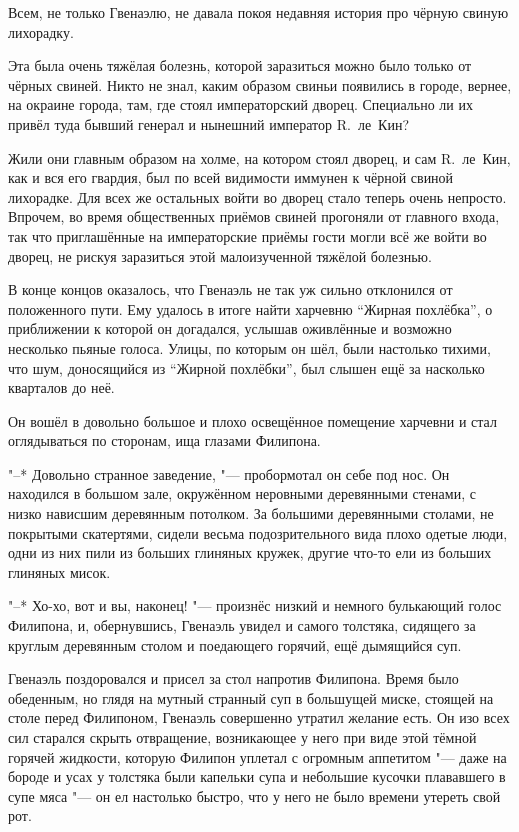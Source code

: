 Всем, не только Гвенаэлю, не давала покоя недавняя история про чёрную свиную
лихорадку.

Эта была очень тяжёлая болезнь, которой заразиться можно было только от чёрных
свиней.
Никто не знал, каким образом свиньи появились в городе, вернее, на окраине
города, там, где стоял императорский дворец.
Специально ли их привёл туда бывший генерал и нынешний император R.~ле~Кин?

Жили они главным образом на холме, на котором стоял дворец, и сам R.~ле~Кин, как
и вся его гвардия, был по всей видимости иммунен к чёрной свиной лихорадке.
Для всех же остальных войти во дворец стало теперь очень непросто.
Впрочем, во время общественных приёмов свиней прогоняли от главного входа, так
что приглашённые на императорские приёмы гости могли всё же войти во дворец, не
рискуя заразиться этой малоизученной тяжёлой болезнью.

В конце концов оказалось, что Гвенаэль не так уж сильно отклонился от
положенного пути.
Ему удалось в итоге найти харчевню \enquote{Жирная похлёбка}, о приближении к
которой он догадался, услышав оживлённые и возможно несколько пьяные голоса.
Улицы, по которым он шёл, были настолько тихими, что шум, доносящийся из
\enquote{Жирной похлёбки}, был слышен ещё за насколько кварталов до неё.

Он вошёл в довольно большое и плохо освещённое помещение харчевни и стал
оглядываться по сторонам, ища глазами Филипона.

"--* Довольно странное заведение, "--- пробормотал он себе под нос.
Он находился в большом зале, окружённом неровными деревянными стенами, с низко
нависшим деревянным потолком.
За большими деревянными столами, не покрытыми скатертями, сидели весьма
подозрительного вида плохо одетые люди, одни из них пили из больших глиняных
кружек, другие что-то ели из больших глиняных мисок.

"--* Хо-хо, вот и вы, наконец! "--- произнёс низкий и немного булькающий голос
Филипона, и, обернувшись, Гвенаэль увидел и самого толстяка, сидящего за круглым
деревянным столом и поедающего горячий, ещё дымящийся суп.

Гвенаэль поздоровался и присел за стол напротив Филипона.
Время было обеденным, но глядя на мутный странный суп в большущей миске, стоящей
на столе перед Филипоном, Гвенаэль совершенно утратил желание есть.
Он изо всех сил старался скрыть отвращение, возникающее у него при виде этой
тёмной горячей жидкости, которую Филипон уплетал с огромным аппетитом "--- даже
на бороде и усах у толстяка были капельки супа и небольшие кусочки плававшего в
супе мяса "--- он ел настолько быстро, что у него не было времени утереть свой
рот.

